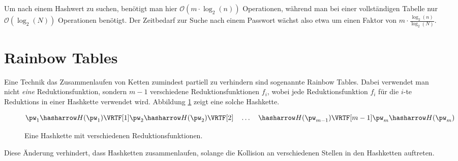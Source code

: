 Um nach einem Hashwert zu suchen, benötigt man hier $\mathcal{O}(m \cdot \log_2(n))$ Operationen, während man bei einer vollständigen Tabelle nur $\mathcal{O}(\log_2(N))$ Operationen benötigt. Der Zeitbedarf zur Suche nach einem Passwort wächst also etwa um einen Faktor von $m \cdot \frac{\log_2(n)}{\log_2(N)}$.

\section{Rainbow Tables}

Eine Technik das Zusammenlaufen von Ketten zumindest partiell zu verhindern sind sogenannte Rainbow Tables. Dabei verwendet man nicht \emph{eine} Reduktionsfunktion, sondern $m-1$ verschiedene Reduktionsfunktionen $f_i$, wobei jede Reduktionsfunktion $f_i$ für die $i$-te Reduktions in einer Hashkette verwendet wird. Abbildung \ref{fig:auth:rainbowhashchain} zeigt eine solche Hashkette.

\begin{figure}[h]
	\begin{equation*}
		\pw_1 \hasharrow H(\pw_1)
		\VRTF[1] \pw_2 \hasharrow H(\pw_2)
		\VRTF[2] %
		\quad \ldots \quad 
		\hasharrow H(\pw_{m-1})
		\VRTF[m-1] \pw_m \hasharrow H(\pw_m)
	\end{equation*}
	\caption{Eine Hashkette mit verschiedenen Reduktionsfunktionen.}
	\label{fig:auth:rainbowhashchain}
\end{figure}

Diese Änderung verhindert, dass Hashketten zusammenlaufen, solange die Kollision an verschiedenen Stellen in den Hashketten auftreten.\\

